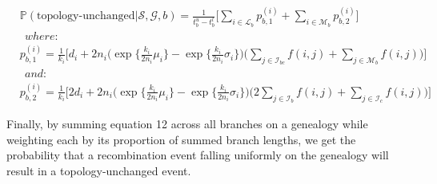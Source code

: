 \documentclass[11pt]{article}
\begin{document}
\begin{equation}
\begin{aligned}
	&\mathbb{P}(\textrm{topology-unchanged} | \mathcal{S},\mathcal{G},b) = 
	\frac{1}{t_b^u - t_b^l} \Bigg[
		\sum_{i \in \mathcal{L}_b} p_{b,1}^{(i)} + 
		\sum_{i \in \mathcal{M}_b} p_{b,2}^{(i)}
	\Bigg]
	\\
	&~~where: 
	\\
	&p_{b,1}^{(i)} = 
		\frac{1}{k_i} \Bigg[
			d_i + 2n_i \Bigg(
				\exp\bigg\{ \frac{k_i}{2n_i}\mu_i \bigg\} - 
				\exp\bigg\{ \frac{k_i}{2n_i}\sigma_i\bigg\}
			\Bigg)
		\Bigg(
			\sum_{j \in \mathcal{I}_{bc}}f(i,j) + \sum_{j \in \mathcal{M}_b}f(i,j)
		\Bigg)
	\Bigg]
	\\
	&~~and: 
	\\
	&p_{b,2}^{(i)} = 
		\frac{1}{k_i} \Bigg[
			2d_i + 2n_i \Bigg(
				\exp\bigg\{\frac{k_i}{2n_i}\mu_i \bigg\} - 
				\exp\bigg\{\frac{k_i}{2n_i}\sigma_{i} \bigg\}
			\Bigg)
		\Bigg(
			2\sum_{j \in \mathcal{I}_b} f(i,j) + \sum_{j \in \mathcal{I}_c} f(i,j)
		\Bigg)
	\Bigg]
    \end{aligned}
\end{equation}




\noindent Finally, by summing equation 12 across all branches on a 
genealogy while weighting each by its proportion of summed branch lengths,
we get the probability that a recombination event falling 
uniformly on the genealogy will result in a topology-unchanged event.
\end{document}

